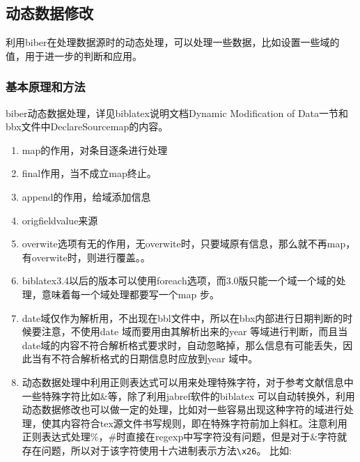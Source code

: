 \subsection{动态数据修改}
利用biber在处理数据源时的动态处理，可以处理一些数据，比如设置一些域的值，用于进一步的判断和应用。

\subsubsection{基本原理和方法}\label{sec:dynamic:modify}
biber动态数据处理，详见biblatex说明文档Dynamic Modification of Data一节和bbx文件中DeclareSourcemap的内容。
  \begin{enumerate}
    \item map的作用，对条目逐条进行处理
    \item final作用，当不成立map终止。
    \item append的作用，给域添加信息
    \item origfieldvalue来源
    \item overwite选项有无的作用，无overwite时，只要域原有信息，那么就不再map，有overwite时，则进行覆盖。。
    \item biblatex3.4以后的版本可以使用foreach选项，而3.0版只能一个域一个域的处理，意味着每一个域处理都要写一个map 步。
    \item date域仅作为解析用，不出现在bbl文件中，所以在bbx内部进行日期判断的时候要注意，不使用date 域而要用由其解析出来的year 等域进行判断，而且当date域的内容不符合解析格式要求时，自动忽略掉，那么信息有可能丢失，因此当有不符合解析格式的日期信息时应放到year 域中。
    \item 动态数据处理中利用正则表达式可以用来处理特殊字符，对于参考文献信息中一些特殊字符比如\&等，除了利用jabref软件的biblatex 可以自动转换外，利用动态数据修改也可以做一定的处理，比如对一些容易出现这种字符的域进行处理，使其内容符合tex源文件书写规则，即在特殊字符前加上斜杠。注意利用正则表达式处理\%，\#时直接在regexp中写字符没有问题，但是对于\&字符就存在问题，所以对于该字符使用十六进制表示方法\verb|\x26|。 比如:




\end{enumerate}
